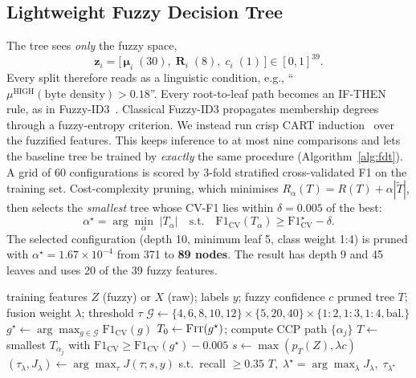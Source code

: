 \documentclass[conference]{IEEEtran}
\begin{document}
\subsection{Lightweight Fuzzy Decision Tree}
The tree sees \emph{only} the fuzzy space,
\begin{equation}
  \mathbf{z}_i=\big[\,\boldsymbol{\mu}_i\;(30),\;\mathbf{R}_i\;(8),\;c_i\;(1)\,\big]\in[0,1]^{39}.
\end{equation}
Every split therefore reads as a linguistic condition, e.g., ``$\mu^{\mathrm{HIGH}}(\text{byte density})>0.18$''. Every root-to-leaf path becomes an IF-THEN rule, as in Fuzzy-ID3~\cite{ye2022,yuan1995}. Classical Fuzzy-ID3 propagates membership degrees through a fuzzy-entropy criterion. We instead run crisp CART induction~\cite{breiman1984} over the fuzzified features. This keeps inference to at most nine comparisons and lets the baseline tree be trained by \emph{exactly} the same procedure (Algorithm~\ref{alg:fdt}). A grid of 60 configurations is scored by 3-fold stratified cross-validated F1 on the training set. Cost-complexity pruning, which minimises $R_\alpha(T)=R(T)+\alpha|\tilde{T}|$, then selects the \emph{smallest} tree whose CV-F1 lies within $\delta=0.005$ of the best:
\begin{equation}
  \alpha^{\star}=\arg\min_{\alpha}\;|T_\alpha|\quad\text{s.t.}\quad \mathrm{F1}_{\mathrm{CV}}(T_\alpha)\ge\mathrm{F1}^{\star}_{\mathrm{CV}}-\delta.
\end{equation}
The selected configuration (depth 10, minimum leaf 5, class weight 1:4) is pruned with $\alpha^{\star}=1.67\times10^{-4}$ from 371 to \textbf{89 nodes}. The result has depth 9 and 45 leaves and uses 20 of the 39 fuzzy features.

\begin{algorithm}[t]
\caption{Shared lightweight tree training and rule fusion}
\label{alg:fdt}
\begin{algorithmic}[1]
\Require training features $Z$ (fuzzy) or $X$ (raw); labels $y$; fuzzy confidence $c$
\Ensure pruned tree $T$; fusion weight $\lambda$; threshold $\tau$
\State $\mathcal{G}\gets\{4,6,8,10,12\}\times\{5,20,40\}\times\{1{:}2,1{:}3,1{:}4,\text{bal.}\}$
\State $g^\star\gets\arg\max_{g\in\mathcal{G}}\mathrm{F1}_{\mathrm{CV}}(g)$ 
\State $T_0\gets\textsc{Fit}(g^\star)$; compute CCP path $\{\alpha_j\}$
\State $T\gets$ smallest $T_{\alpha_j}$ with $\mathrm{F1}_{\mathrm{CV}}\ge\mathrm{F1}_{\mathrm{CV}}(g^\star)-0.005$
  \State $s\gets\max(p_T(Z),\lambda c)$
  \State $(\tau_\lambda,J_\lambda)\gets\arg\max_{\tau}J(\tau;s,y)$ s.t.\ recall $\ge0.35$
\EndFor
\State \Return $T,\;\lambda^\star=\arg\max_\lambda J_\lambda,\;\tau_{\lambda^\star}$
\end{algorithmic}
\end{algorithm}
\end{document}
